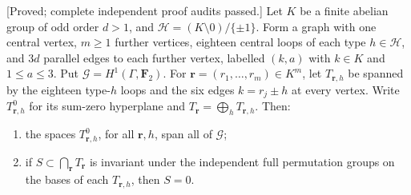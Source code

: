 \begin{lemma}
\label{lem:mixed-odd-common-graph-candidate}
\textup{[Proved; complete independent proof audits passed.]}
Let $K$ be a finite abelian group of odd order $d>1$, and
$\mathcal H=(K\setminus0)/\{\pm1\}$. Form a graph with one
central vertex, $m\geq1$ further vertices, eighteen central
loops of each type $h\in\mathcal H$, and $3d$ parallel edges
to each further vertex, labelled $(k,a)$ with $k\in K$ and
$1\leq a\leq3$. Put $\mathcal G=H^1(\Gamma,\mathbf F_2)$.
For $\mathbf r=(r_1,\ldots,r_m)\in K^m$, let $T_{\mathbf r,h}$
be spanned by the eighteen type-$h$ loops and the six edges
$k=r_j\pm h$ at every vertex. Write $T_{\mathbf r,h}^0$ for
its sum-zero hyperplane and $T_{\mathbf r}=\bigoplus_hT_{\mathbf r,h}$.
Then:
\begin{enumerate}
\item the spaces $T_{\mathbf r,h}^0$, for all $\mathbf r,h$,
span all of $\mathcal G$;
\item if $S\subset\bigcap_{\mathbf r}T_{\mathbf r}$ is invariant
under the independent full permutation groups on the bases of
each $T_{\mathbf r,h}$, then $S=0$.
\end{enumerate}
\end{lemma}
